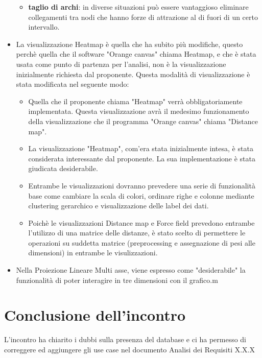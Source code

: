 \documentclass{article}
\begin{document}
\begin{itemize}
\begin {itemize}
			\item \textbf{taglio di archi}: in diverse situazioni può essere vantaggioso eliminare collegamenti tra nodi che hanno forze di attrazione al di fuori di un certo intervallo.
		\end {itemize}
		\item La visualizzazione Heatmap è quella che ha subito più modifiche, questo perchè quella che il software "Orange canvas" chiama Heatmap, e che è stata usata come punto di partenza per l'analisi, non è la visualizzazione inizialmente richiesta dal proponente. Questa modalità di visualizzazione è stata modificata nel seguente modo:
		\begin {itemize}
			\item Quella che il proponente chiama "Heatmap" verrà obbligatoriamente implementata. Questa visualizzazione avrà il medesimo funzionamento della visualizzazione che il programma "Orange canvas" chiama "Distance map".
			\item La visualizzazione "Heatmap", com'era stata inizialmente intesa, è stata considerata interessante dal proponente. La sua implementazione è stata giudicata desiderabile.
			\item Entrambe le visualizzazioni dovranno prevedere una serie di funzionalità base come cambiare la scala di colori, ordinare righe e colonne mediante clustering gerarchico e visualizzazione delle label dei dati.
			\item Poichè le visualizzazioni Distance map e Force field prevedono entrambe l'utilizzo di una matrice delle distanze, è stato scelto di permettere le operazioni su suddetta matrice (preprocessing e assegnazione di pesi alle dimensioni) in entrambe le visulizzazioni.
		\end {itemize}
		\item Nella Proiezione Lineare Multi asse, viene espresso come "desiderabile" la funzionalità di poter interagire in tre dimensioni con il grafico.m
	  \end{itemize}

\section{Conclusione dell'incontro}
\label{sec:conclusione}
L'incontro ha chiarito i dubbi sulla presenza del database e ci ha permesso di correggere ed aggiungere gli use case nel documento Analisi dei Requisiti X.X.X
\end{document}

